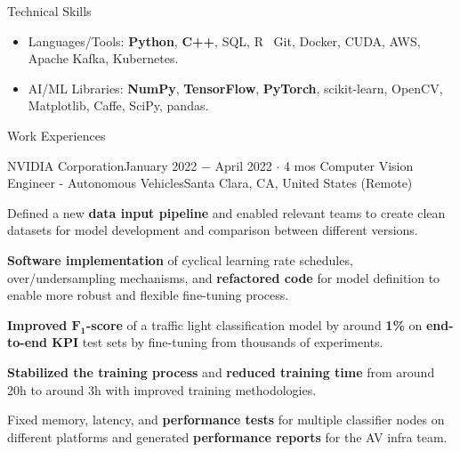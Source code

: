 \documentclass{resume}
\begin{document}
\begin{rSection}{Technical Skills}

    \begin{itemize}
        \item Languages/Tools: \textbf{Python}, \textbf{C++}, SQL, R \textbar\ Git, Docker, CUDA, AWS, Apache Kafka, Kubernetes.
        \item AI/ML Libraries: \textbf{NumPy}, \textbf{TensorFlow}, \textbf{PyTorch}, scikit-learn, OpenCV, Matplotlib, Caffe, SciPy, pandas.
    \end{itemize}

\end{rSection}

\begin{rSection}{Work Experiences}

    \begin{rSubsection}{NVIDIA Corporation}{January 2022 \(-\) April 2022 \(\cdot\) 4 mos}
        {Computer Vision Engineer - Autonomous Vehicles}{Santa Clara, CA, United States (Remote)}
        \item Defined a new \textbf{data input pipeline} and enabled relevant teams to create clean datasets for model development
        and comparison between different versions.
        \item \textbf{Software implementation} of cyclical learning rate schedules, over/undersampling mechanisms, and \textbf{refactored code} for model definition
        to enable more robust and flexible fine-tuning process.
        \item \textbf{Improved \(\boldsymbol{F_{1}}\)-score} of a traffic light classification model by around \textbf{1\%} on \textbf{end-to-end KPI} test sets
        by fine-tuning from thousands of experiments.
        \item \textbf{Stabilized the training process} and \textbf{reduced training time} from around 20h to around 3h with improved training methodologies.
        \item Fixed memory, latency, and \textbf{performance tests} for multiple classifier nodes on different platforms and generated \textbf{performance reports} for the AV infra team.
    \end{rSubsection}


\end{rSection}
\end{document}

